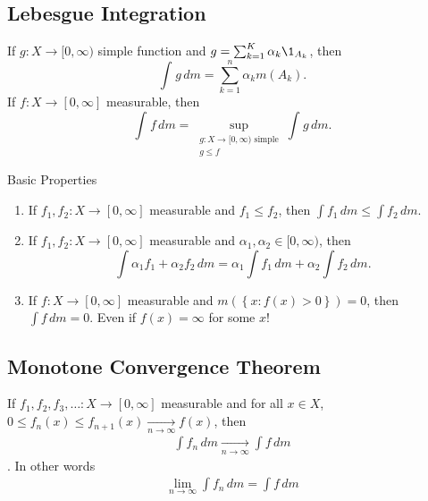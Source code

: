 \subsection{Lebesgue Integration}

\begin{definition}
	If $g : X \to [0, \infty)$ simple function and $g = \sum_{k = 1}^{K} \alpha_k \1_{A_k}$, then
\[
	\int_{}^{} g \,dm = \sum_{k = 1}^{n} \alpha_k m(A_k).
\]
If $f : X \to [0, \infty]$ measurable, then
\[
	\int_{}^{} f \,dm = \sup_{\substack{g : X  \to [0, \infty) \textrm{ simple} \\ g \leq f}} \int_{}^{} g \,dm.
\]
\end{definition}

Basic Properties
\begin{enumerate}
	\item If $f_1, f_2 : X \to [0, \infty]$ measurable and $f_1 \leq f_2$, then $\int f_1 \, dm \leq \int f_2 \, dm$.
	\item If $f_1, f_2 : X \to [0, \infty]$ measurable and $\alpha_1, \alpha_2 \in [0, \infty)$, then
	\[
		\int \alpha_1 f_1 + \alpha_2 f_2 \, dm = \alpha_1 \int f_1 \, dm + \alpha_2 \int f_2 \, dm.
	\]
	\item If $f : X \to [0, \infty]$ measurable and $m( \left\{x : f(x) > 0 \right\}) = 0$, then $\int f \,dm = 0$. Even if $f(x) = \infty$ for some $x$!
\end{enumerate}

\subsection{Monotone Convergence Theorem}

\begin{theorem}
	If $f_1, f_2, f_3, \ldots : X \to [0, \infty]$ measurable and for all $x \in X$, $0 \leq f_n(x) \leq f_{n+1}(x) \xrightarrow[n \to \infty]{} f(x)$, then 
	\begin{align*}
		\int f_n \, dm \xrightarrow[n \to \infty]{} \int f \, dm
	\end{align*}
	. In other words
	\begin{align*}
		\lim_{n \to \infty} \int f_n \, dm = \int f \, dm
	\end{align*} 
\end{theorem}

